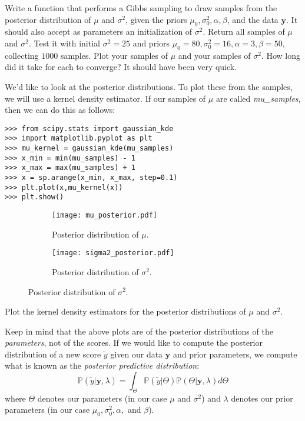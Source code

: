 \begin{problem}
Write a function that performs a Gibbs sampling to draw samples from the posterior distribution of $\mu$ and $\sigma^{2}$, given the priors $\mu_{0}, \sigma_{0}^{2}, \alpha,\beta$, and the data $\mathbf{y}$. It should also accept as parameters an initialization of $\sigma^{2}$. Return all samples of $\mu$ and $\sigma^{2}$. Test it with initial $\sigma^{2} = 25$ and priors $\mu_{0}=80, \sigma_{0}^{2} = 16, \alpha = 3, \beta = 50$, collecting $1000$ samples. Plot your samples of $\mu$ and your samples of $\sigma^{2}$. How long did it take for each to converge? It should have been very quick.
\end{problem}

We'd like to look at the posterior distributions. To plot these from the samples, we will use a kernel density estimator. If our samples of $\mu$ are called \emph{mu\_samples}, then we can do this as follows:
\begin{lstlisting}
>>> from scipy.stats import gaussian_kde
>>> import matplotlib.pyplot as plt
>>> mu_kernel = gaussian_kde(mu_samples)
>>> x_min = min(mu_samples) - 1
>>> x_max = max(mu_samples) + 1
>>> x = sp.arange(x_min, x_max, step=0.1)
>>> plt.plot(x,mu_kernel(x))
>>> plt.show()
\end{lstlisting}

\begin{figure}[h]
	\centering
	\begin{subfigure}[b]{.49\textwidth}
		\centering
		\texttt{[image: mu\_posterior.pdf]}
		\caption{Posterior distribution of $\mu$.}
	\end{subfigure}
	\begin{subfigure}[b]{.49\textwidth}
		\centering
		\texttt{[image: sigma2\_posterior.pdf]}
		\caption{Posterior distribution of $\sigma^2$.}
	\end{subfigure}
\end{figure}

\begin{problem}
Plot the kernel density estimators for the posterior distributions of $\mu$ and $\sigma^{2}$.
\end{problem}

Keep in mind that the above plots are of the posterior distributions of the \emph{parameters}, not of the scores. If we would like to compute the posterior distribution of a new score $\tilde{y}$ given our data $\mathbf{y}$ and prior parameters, we compute what is known as the \emph{posterior predictive distribution}: 
\begin{equation*}
\mathbb{P}(\tilde{y} | \mathbf{y}, \lambda) = \int_{\Theta} \mathbb{P}(\tilde{y} | \Theta)\mathbb{P}(\Theta | \mathbf{y}, \lambda) d\Theta
\end{equation*}
where $\Theta$ denotes our parameters (in our case $\mu$ and $\sigma^{2}$) and $\lambda$ denotes our prior parameters (in our case $\mu_{0}, \sigma_{0}^{2}, \alpha,$ and $\beta$).

